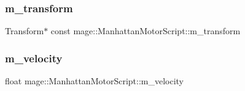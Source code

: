 \subsubsection{\texorpdfstring{m\+\_\+transform}{m\_transform}}
{\footnotesize\ttfamily Transform$\ast$ const mage\+::\+Manhattan\+Motor\+Script\+::m\+\_\+transform\hspace{0.3cm}{\ttfamily [private]}}

\hypertarget{classmage_1_1_manhattan_motor_script_a824893c374fa6f271a964751dc1a59ec}{}\label{classmage_1_1_manhattan_motor_script_a824893c374fa6f271a964751dc1a59ec} 
\subsubsection{\texorpdfstring{m\+\_\+velocity}{m\_velocity}}
{\footnotesize\ttfamily float mage\+::\+Manhattan\+Motor\+Script\+::m\+\_\+velocity\hspace{0.3cm}{\ttfamily [private]}}

